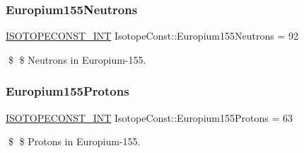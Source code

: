 \subsubsection{\texorpdfstring{Europium155\+Neutrons}{Europium155Neutrons}}
{\footnotesize\ttfamily \mbox{\hyperlink{group___isotope_const-_macros_ga5f18360b3e99483a35c32d789e62621c}{I\+S\+O\+T\+O\+P\+E\+C\+O\+N\+S\+T\+\_\+\+I\+NT}} Isotope\+Const\+::\+Europium155\+Neutrons = 92}

\$ \$ Neutrons in Europium-\/155. \mbox{\label{group___isotope_const-_europium-_eu155_ga223edb3f2eff0d787c79cb2f433d0c6d}} 
\subsubsection{\texorpdfstring{Europium155\+Protons}{Europium155Protons}}
{\footnotesize\ttfamily \mbox{\hyperlink{group___isotope_const-_macros_ga5f18360b3e99483a35c32d789e62621c}{I\+S\+O\+T\+O\+P\+E\+C\+O\+N\+S\+T\+\_\+\+I\+NT}} Isotope\+Const\+::\+Europium155\+Protons = 63}

\$ \$ Protons in Europium-\/155. 